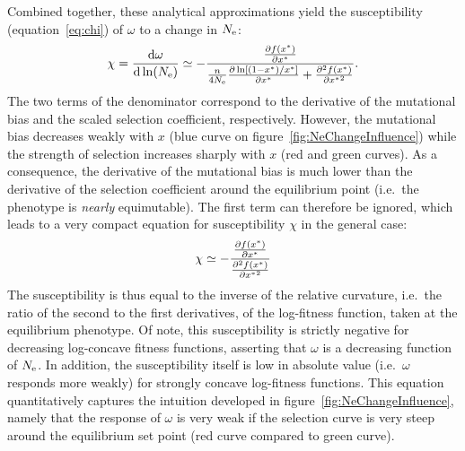 \documentclass{article}
\begin{document}
Combined together, these analytical approximations yield the susceptibility (equation~\ref{eq:chi}) of $\omega$ to a change in $N_{\text{e}}$:
\begin{gather}
    \chi = \frac{ \mathrm{d} \omega}{\mathrm{d} \ln (N_{\text{e}})} \simeq - \frac{\frac{ \partial f (x^{*}) }{\partial {x^{*}}}}{\frac{n}{4 N_{\text{e}}} \frac{\partial \ln [ (1 - x^{*}) / x^{*} ]}{\partial x^{*} } + \frac{ \partial^2 f (x^{*}) }{\partial {x^{*}}^2}}.
\end{gather}
The two terms of the denominator correspond to the derivative of the mutational bias and the scaled selection coefficient, respectively.
However, the mutational bias decreases weakly with $x$ (blue curve on figure~\ref{fig:NeChangeInfluence}) while the strength of selection increases sharply with $x$ (red and green curves).
As a consequence, the derivative of the mutational bias is much lower than the derivative of the selection coefficient around the equilibrium point (i.e.~the {phenotype} is \textit{nearly} equimutable).
The first term can therefore be ignored, which leads to a very compact equation for susceptibility $\chi$ in the general case:
\begin{gather}
    \chi \simeq - \frac{\frac{ \partial f (x^{*}) }{\partial {x^{*}}}}{\frac{ \partial^2 f (x^{*}) }{\partial {x^{*}}^2}}
\end{gather}
The susceptibility is thus equal to the inverse of the relative curvature, i.e.~the ratio of the second to the first derivatives, of the log-fitness function, taken at the equilibrium {phenotype}.
Of note, this susceptibility is strictly negative for decreasing log-concave fitness functions, asserting that $\omega$ is a decreasing function of $N_{\text{e}}$.
In addition, the susceptibility itself is low in absolute value (i.e.~$\omega$ responds more weakly) for strongly concave log-fitness functions.
This equation quantitatively captures the intuition developed in figure~\ref{fig:NeChangeInfluence}, namely that the response of $\omega$ is very weak if the selection curve is very steep around the equilibrium set point (red curve compared to green curve).
\end{document}

